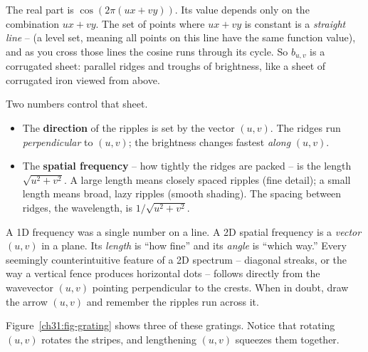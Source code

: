 The real part is $\cos(2\pi(ux+vy))$. Its value depends only on the
combination $ux+vy$. The set of points where $ux+vy$ is constant is a
\emph{straight line} -- (a level set, meaning all points on this line have the same function value), and as you cross those lines the cosine runs
through its cycle. So $b_{u,v}$ is a corrugated sheet: parallel ridges and
troughs of brightness, like a sheet of corrugated iron viewed from above.

Two numbers control that sheet.

\begin{itemize}
\item The \textbf{direction} of the ripples is set by the vector
$(u,v)$. The ridges run \emph{perpendicular} to $(u,v)$; the brightness changes
fastest \emph{along} $(u,v)$.
\item The \textbf{spatial frequency} -- how tightly the ridges are packed -- is the
length $\sqrt{u^2+v^2}$. A large length means closely spaced ripples (fine
detail); a small length means broad, lazy ripples (smooth shading). The spacing
between ridges, the wavelength, is $1/\sqrt{u^2+v^2}$.
\end{itemize}

\begin{intuitionbox}
A 1D frequency was a single number on a line. A 2D spatial frequency is a
\emph{vector} $(u,v)$ in a plane. Its \emph{length} is ``how fine'' and its
\emph{angle} is ``which way.'' Every seemingly counterintuitive feature of a 2D spectrum -- diagonal
streaks, or the way a vertical fence produces horizontal dots -- follows directly
from the wavevector $(u,v)$ pointing perpendicular to the crests. When in doubt, draw the arrow $(u,v)$ and remember
the ripples run across it.
\end{intuitionbox}

Figure~\ref{ch31:fig-grating} shows three of these gratings. Notice that rotating
$(u,v)$ rotates the stripes, and lengthening $(u,v)$ squeezes them together.

